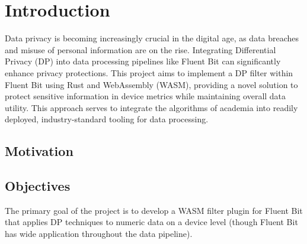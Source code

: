 \chapter{Introduction\label{chap:introduction}}

Data privacy is becoming increasingly crucial in the digital age, as data breaches and misuse of personal information are on the rise. Integrating Differential Privacy (DP) into data processing pipelines like Fluent Bit can significantly enhance privacy protections. This project aims to implement a DP filter within Fluent Bit using Rust and WebAssembly (WASM), providing a novel solution to protect sensitive information in device metrics while maintaining overall data utility. This approach serves to integrate the algorithms of academia into readily deployed, industry-standard tooling for data processing.

\section{Motivation}

\section{Objectives}
The primary goal of the project is to develop a WASM filter plugin for Fluent Bit that applies DP techniques to numeric data on a device level (though Fluent Bit has wide application throughout the data pipeline).